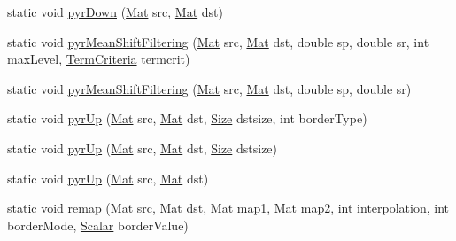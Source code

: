 \begin{DoxyCompactItemize}
\item 
static void \mbox{\hyperlink{classorg_1_1opencv_1_1imgproc_1_1_imgproc_a717ca1f10b089cf6ec50dc0c634cf5e7}{pyr\+Down}} (\mbox{\hyperlink{classorg_1_1opencv_1_1core_1_1_mat}{Mat}} src, \mbox{\hyperlink{classorg_1_1opencv_1_1core_1_1_mat}{Mat}} dst)
\item 
static void \mbox{\hyperlink{classorg_1_1opencv_1_1imgproc_1_1_imgproc_a1e4e4c176ebc30a3f5ab6f242c30db4e}{pyr\+Mean\+Shift\+Filtering}} (\mbox{\hyperlink{classorg_1_1opencv_1_1core_1_1_mat}{Mat}} src, \mbox{\hyperlink{classorg_1_1opencv_1_1core_1_1_mat}{Mat}} dst, double sp, double sr, int max\+Level, \mbox{\hyperlink{classorg_1_1opencv_1_1core_1_1_term_criteria}{Term\+Criteria}} termcrit)
\item 
static void \mbox{\hyperlink{classorg_1_1opencv_1_1imgproc_1_1_imgproc_ac61221bc09dbc9e8bdd92a9b3f1126b2}{pyr\+Mean\+Shift\+Filtering}} (\mbox{\hyperlink{classorg_1_1opencv_1_1core_1_1_mat}{Mat}} src, \mbox{\hyperlink{classorg_1_1opencv_1_1core_1_1_mat}{Mat}} dst, double sp, double sr)
\item 
static void \mbox{\hyperlink{classorg_1_1opencv_1_1imgproc_1_1_imgproc_aa55d915e843c305139824579332e90e9}{pyr\+Up}} (\mbox{\hyperlink{classorg_1_1opencv_1_1core_1_1_mat}{Mat}} src, \mbox{\hyperlink{classorg_1_1opencv_1_1core_1_1_mat}{Mat}} dst, \mbox{\hyperlink{classorg_1_1opencv_1_1core_1_1_size}{Size}} dstsize, int border\+Type)
\item 
static void \mbox{\hyperlink{classorg_1_1opencv_1_1imgproc_1_1_imgproc_ad1f5f14fec2da659a02267cc5399ab83}{pyr\+Up}} (\mbox{\hyperlink{classorg_1_1opencv_1_1core_1_1_mat}{Mat}} src, \mbox{\hyperlink{classorg_1_1opencv_1_1core_1_1_mat}{Mat}} dst, \mbox{\hyperlink{classorg_1_1opencv_1_1core_1_1_size}{Size}} dstsize)
\item 
static void \mbox{\hyperlink{classorg_1_1opencv_1_1imgproc_1_1_imgproc_abd25266f8f94c20c8112899d52de4af6}{pyr\+Up}} (\mbox{\hyperlink{classorg_1_1opencv_1_1core_1_1_mat}{Mat}} src, \mbox{\hyperlink{classorg_1_1opencv_1_1core_1_1_mat}{Mat}} dst)
\item 
static void \mbox{\hyperlink{classorg_1_1opencv_1_1imgproc_1_1_imgproc_a8a8e3511105ae0f5fbd525e31ad7672c}{remap}} (\mbox{\hyperlink{classorg_1_1opencv_1_1core_1_1_mat}{Mat}} src, \mbox{\hyperlink{classorg_1_1opencv_1_1core_1_1_mat}{Mat}} dst, \mbox{\hyperlink{classorg_1_1opencv_1_1core_1_1_mat}{Mat}} map1, \mbox{\hyperlink{classorg_1_1opencv_1_1core_1_1_mat}{Mat}} map2, int interpolation, int border\+Mode, \mbox{\hyperlink{classorg_1_1opencv_1_1core_1_1_scalar}{Scalar}} border\+Value)

\end{DoxyCompactItemize}
